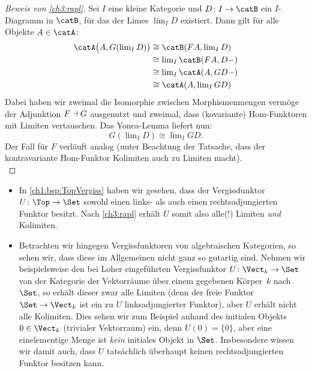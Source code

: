 \begin{proof}[Beweis von \cref{ch3:rapl}]
    Sei $I$ eine kleine Kategorie und $D\colon I\to\catB$ ein $I$-Diagramm
    in $\catB$, für das der Limes $\lim_I D$ existiert. Dann gilt für alle
    Objekte $A\in\catA$:
    \begin{align*}
        \catA\bigl(A, G(\lim\nolimits_I D)\bigr)
        &\cong \catB(FA, \lim\nolimits_I D)          \\
        &\cong \lim\nolimits_I \catB(FA, D\blank)    \\
        &\cong \lim\nolimits_I \catA(A, GD\blank)    \\
        &\cong \catA(A,\lim\nolimits_I GD)
    \end{align*}
    Dabei haben wir zweimal die Isomorphie zwischen Morphismenmengen vermöge der
    Adjunktion $F\dashv G$ ausgenutzt und zweimal, dass (kovariante) 
    Hom-Funktoren mit Limiten vertauschen. Das Yonea-Lemma liefert nun: 
    \[ G(\lim\nolimits_I D) \cong \lim\nolimits_I GD  . \]
    Der Fall für $F$ verläuft analog (unter Beachtung der Tatsache, dass der
    kontravariante Hom-Funktor Kolimiten auch zu Limiten macht).
    \\
\end{proof}

\begin{thBeispiel}\hfill
    \begin{itemize}
        \item
            In \cref{ch1:bsp:TopVergiss} haben wir gesehen, dass der Vergissfunktor
            $U\colon\Top\to\Set$ sowohl einen links- als auch einen rechtsadjungierten
            Funktor besitzt. Nach \cref{ch3:rapl} erhält $U$ somit also alle(!) Limiten
            \emph{und} Kolimiten.
            
        \item
            Betrachten wir hingegen Vergissfunktoren von algebraischen Kategorien, so
            sehen wir, dass diese im Allgemeinen nicht ganz so gutartig sind. Nehmen wir
            beispielsweise den bei Loher\cite[1.3]{talk:loher} eingeführten
            Vergissfunktor $U\colon \Vect_k\to\Set$ von der Kategorie der Vektorräume
            über einem gegebenen Körper~$k$ nach $\Set$, so erhält dieser zwar alle
            Limiten (denn der freie Funktor $\Set\to\Vect_k$ ist ein zu $U$
            linksadjungierter Funktor), aber $U$ erhält nicht alle Kolimiten. Dies sehen
            wir zum Beispiel anhand des initialen Objekts $0\in\Vect_k$ (trivialer
            Vektorraum) ein, denn $U(0) = \{0\}$, aber eine einelementige Menge ist
            \emph{kein} initiales Objekt in $\Set$. Insbesondere wissen wir damit auch,
            dass $U$ tatsächlich überhaupt keinen rechtsadjungierten Funktor
            besitzen kann. 
    \end{itemize}
\end{thBeispiel}


